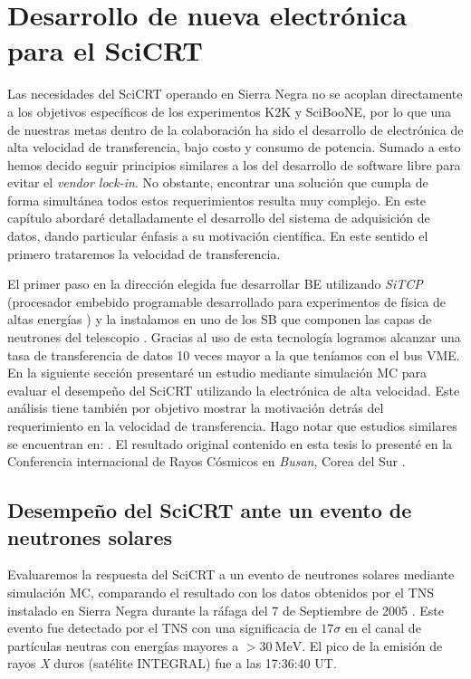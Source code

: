 
\chapter{Desarrollo de nueva electrónica para el SciCRT}
\label{chap:tres}

Las necesidades del SciCRT operando en Sierra Negra no se acoplan directamente a los objetivos específicos de los experimentos K2K y SciBooNE, por lo que una de nuestras metas dentro de la colaboración ha sido el desarrollo de electrónica de alta velocidad de transferencia, bajo costo y consumo de potencia. Sumado a esto hemos decido seguir principios similares a los del desarrollo de software libre para evitar el \emph{vendor lock-in}. No obstante, encontrar una solución que cumpla de forma simultánea todos estos requerimientos resulta muy complejo. En este capítulo abordaré detalladamente el desarrollo del sistema de adquisición de datos, dando particular énfasis a su motivación científica. En este sentido el primero trataremos la velocidad de transferencia.

El primer paso en la dirección elegida fue desarrollar BE utilizando \emph{SiTCP} (procesador embebido programable desarrollado para experimentos de física de altas energías \cite{uchida08}) y la instalamos en uno de los SB que componen las capas de neutrones del telescopio \cite{ysasai17}. Gracias al uso de esta tecnología logramos alcanzar una tasa de transferencia de datos \num{10} veces mayor a la que teníamos con el bus VME. En la siguiente sección presentaré un estudio mediante simulación MC para evaluar el desempeño del SciCRT utilizando la electrónica de alta velocidad. Este análisis tiene también por objetivo mostrar la motivación detrás del requerimiento en la velocidad de transferencia. Hago notar que estudios similares se encuentran en: \cite{ynagai14,ysasai17}. El resultado original contenido en esta tesis lo presenté en la Conferencia internacional de Rayos Cósmicos en \emph{Busan}, Corea del Sur \cite{manzorena171}.

\section{Desempeño del SciCRT ante un evento de neutrones solares}

Evaluaremos la respuesta del SciCRT a un evento de neutrones solares mediante simulación MC, comparando el resultado con los datos obtenidos por el TNS instalado en Sierra Negra durante la ráfaga del \num{7} de Septiembre de \num{2005} \cite{sako06}. Este evento fue detectado por el TNS con una significacia de $17\sigma$ en el canal de partículas neutras con energías mayores a $>\SI{30}{\mega\electronvolt}$. El pico de la emisión de rayos \emph{X} duros (satélite INTEGRAL) fue a las 17:36:40 UT.

